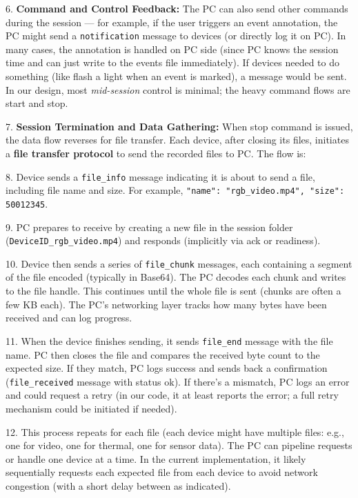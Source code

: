 6.  \textbf{Command and Control Feedback:} The PC can also send other
    commands during the session --- for example, if the user triggers an
    event annotation, the PC might send a \texttt{notification} message to
    devices (or directly log it on PC). In many cases, the annotation is
    handled on PC side (since PC knows the session time and can just
    write to the events file immediately). If devices needed to do
    something (like flash a light when an event is marked), a message
    would be sent. In our design, most \textit{mid-session} control is minimal;
    the heavy command flows are start and stop.

7.  \textbf{Session Termination and Data Gathering:} When stop command is
    issued, the data flow reverses for file transfer. Each device, after
    closing its files, initiates a \textbf{file transfer protocol} to send
    the recorded files to PC. The flow is:

8.  Device sends a \texttt{file_info} message indicating it is about to send a
    file, including file name and
    size\cite{ref48}\cite{ref49}.
    For example, \texttt{"name": "rgb_video.mp4", "size": 50012345}.

9.  PC prepares to receive by creating a new file in the session folder
    (\texttt{DeviceID_rgb_video.mp4}) and responds (implicitly via ack or
    readiness).

10. Device then sends a series of \texttt{file_chunk} messages, each containing
    a segment of the file encoded (typically in
    Base64)\cite{ref50}.
    The PC decodes each chunk and writes to the file
    handle\cite{ref51}.
    This continues until the whole file is sent (chunks are often a few
    KB each). The PC's networking layer tracks how many bytes have been
    received and can log
    progress\cite{ref52}.

11. When the device finishes sending, it sends \texttt{file_end} message with
    the file
    name\cite{ref53}.
    PC then closes the file and compares the received byte count to the
    expected
    size\cite{ref54}.
    If they match, PC logs success and sends back a confirmation
    (\texttt{file_received} message with status
    ok)\cite{ref55}.
    If there's a mismatch, PC logs an error and could request a retry
    (in our code, it at least reports the error; a full retry mechanism
    could be initiated if needed).

12. This process repeats for each file (each device might have multiple
    files: e.g., one for video, one for thermal, one for sensor data).
    The PC can pipeline requests or handle one device at a time. In the
    current implementation, it likely sequentially requests each
    expected file from each
    device\cite{ref56}
    to avoid network congestion (with a short delay between as
    indicated\cite{ref57}).

